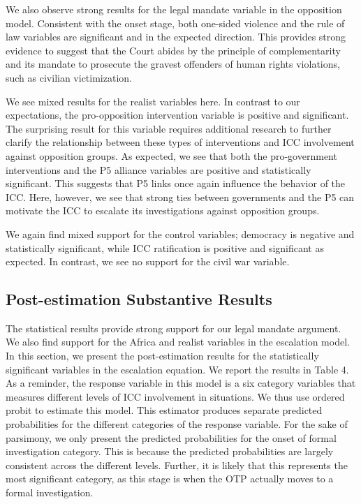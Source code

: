 We also observe strong results for the legal mandate variable in the opposition model. Consistent with the onset stage, both one-sided violence and the rule of law variables are significant and in the expected direction.  This provides strong evidence to suggest that the Court abides by the principle of complementarity and its mandate to prosecute the gravest offenders of human rights violations, such as civilian victimization.

We see mixed results for the realist variables here. In contrast to our expectations, the pro-opposition intervention variable is positive and significant. The surprising result for this variable requires additional research to further clarify the relationship between these types of interventions and ICC involvement against opposition groups.  As expected, we see that both the pro-government interventions and the P5 alliance variables are positive and statistically significant. This suggests that P5 links once again influence the behavior of the ICC. Here, however, we see that strong ties between governments and the P5 can motivate the ICC to escalate its investigations against opposition groups.

We again find mixed support for the control variables; democracy is negative and statistically significant, while ICC ratification is positive and significant as expected. In contrast, we see no support for the civil war variable. 

\subsection*{Post-estimation Substantive Results}

The statistical results provide strong support for our legal mandate argument. We also find support for the Africa and realist variables in the escalation model. In this section, we present the post-estimation results for the statistically significant variables in the escalation equation.  We report the results in Table 4. As a reminder, the response variable in this model is a six category variables that measures different levels of ICC involvement in situations. We thus use ordered probit to estimate this model. This estimator produces separate predicted probabilities for the different categories of the response variable.  For the sake of parsimony, we only present the predicted probabilities for the onset of formal investigation category. This is because the predicted probabilities are largely consistent across the different levels. Further, it is likely that this represents the most significant category, as this stage is when the OTP actually moves to a formal investigation. 

